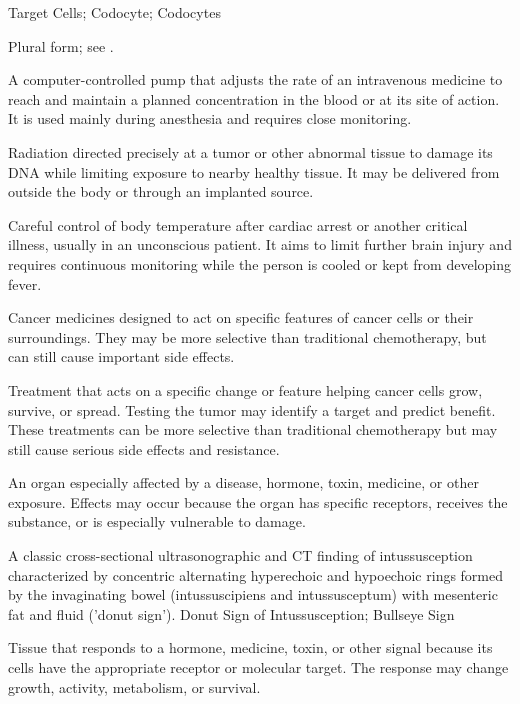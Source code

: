 \synonyms
Target Cells; Codocyte; Codocytes

 Plural form; see .

 A computer-controlled pump that adjusts the rate of an intravenous medicine to reach and maintain a planned concentration in the blood or at its site of action. It is used mainly during anesthesia and requires close monitoring.

 Radiation directed precisely at a tumor or other abnormal tissue to damage its DNA while limiting exposure to nearby healthy tissue. It may be delivered from outside the body or through an implanted source.

 Careful control of body temperature after cardiac arrest or another critical illness, usually in an unconscious patient. It aims to limit further brain injury and requires continuous monitoring while the person is cooled or kept from developing fever.

 Cancer medicines designed to act on specific features of cancer cells or their surroundings. They may be more selective than traditional chemotherapy, but can still cause important side effects.

 Treatment that acts on a specific change or feature helping cancer cells grow, survive, or spread. Testing the tumor may identify a target and predict benefit. These treatments can be more selective than traditional chemotherapy but may still cause serious side effects and resistance.

 An organ especially affected by a disease, hormone, toxin, medicine, or other exposure. Effects may occur because the organ has specific receptors, receives the substance, or is especially vulnerable to damage.

 A classic cross-sectional ultrasonographic and CT finding of intussusception characterized by concentric alternating hyperechoic and hypoechoic rings formed by the invaginating bowel (intussuscipiens and intussusceptum) with mesenteric fat and fluid ('donut sign').
\synonyms
Donut Sign of Intussusception; Bullseye Sign

 Tissue that responds to a hormone, medicine, toxin, or other signal because its cells have the appropriate receptor or molecular target. The response may change growth, activity, metabolism, or survival.

